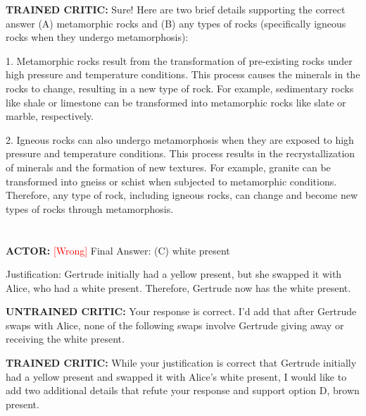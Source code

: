 \textbf{TRAINED CRITIC:}
 Sure! Here are two brief details supporting the correct answer (A) metamorphic rocks and (B) any types of rocks (specifically igneous rocks when they undergo metamorphosis):

1. Metamorphic rocks result from the transformation of pre-existing rocks under high pressure and temperature conditions. This process causes the minerals in the rocks to change, resulting in a new type of rock. For example, sedimentary rocks like shale or limestone can be transformed into metamorphic rocks like slate or marble, respectively.

2. Igneous rocks can also undergo metamorphosis when they are exposed to high pressure and temperature conditions. This process results in the recrystallization of minerals and the formation of new textures. For example, granite can be transformed into gneiss or schist when subjected to metamorphic conditions. Therefore, any type of rock, including igneous rocks, can change and become new types of rocks through metamorphosis.








\section*{}

\section*{}



\textbf{ACTOR:} \textcolor{red}{[Wrong]}
 Final Answer: (C) white present

Justification: Gertrude initially had a yellow present, but she swapped it with Alice, who had a white present. Therefore, Gertrude now has the white present.



\textbf{UNTRAINED CRITIC:}
 Your response is correct. I'd add that after Gertrude swaps with Alice, none of the following swaps involve Gertrude giving away or receiving the white present.



\textbf{TRAINED CRITIC:}
 While your justification is correct that Gertrude initially had a yellow present and swapped it with Alice's white present, I would like to add two additional details that refute your response and support option D, brown present.

